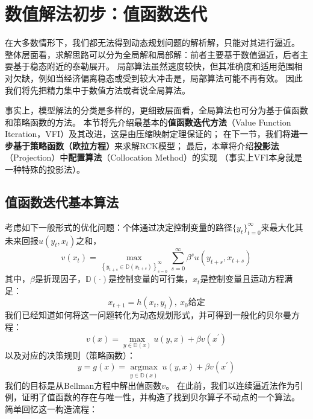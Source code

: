 
\section{数值解法初步：值函数迭代}  \label{sec-numerical-methods-pre}

在大多数情形下，我们都无法得到动态规划问题的解析解，只能对其进行逼近。
整体层面看，求解思路可以分为全局解和局部解：前者主要基于数值逼近，后者主要基于稳态附近的泰勒展开。
局部算法虽然速度较快，但其准确度和适用范围相对欠缺，例如当经济偏离稳态或受到较大冲击是，局部算法可能不再有效。
因此我们将先把精力集中于数值方法或者说全局算法。

事实上，模型解法的分类是多样的，更细致层面看，全局算法也可分为基于值函数和策略函数的方法。
本节将先介绍最基本的\textbf{值函数迭代方法}（Value Function Iteration，VFI）及其改进，这是由压缩映射定理保证的；
在下一节，我们将\textbf{进一步基于策略函数（欧拉方程）}来求解RCK模型；
最后，本章将介绍\textbf{投影法}（Projection）中\textbf{配置算法}（Collocation Method）的实现
（事实上VFI本身就是一种特殊的投影法）。


\subsection{值函数迭代基本算法}

考虑如下一般形式的优化问题：个体通过决定控制变量的路径$\{y_t\}_{t=0}^{\infty}$来最大化其未来回报$u(y_t,x_t)$之和，
\begin{equation*}
    v\left(x_t\right) = \max _{\left\{y_{t+s} \in \mathbb{D}\left(x_{t+s}\right)\right\}_{s=0}^{\infty}} 
        \sum_{s=0}^{\infty} \beta^s u\left(y_{t+s}, x_{t+s}\right)
\end{equation*}
其中，$\beta$是折现因子，$\mathbb{D}(\cdot)$是控制变量的可行集，$x_t$是控制变量且运动方程满足：
\begin{equation*}
    x_{t+1} = h(x_t,y_t), ~x_0\text{给定}
\end{equation*}
我们已经知道如何将这一问题转化为动态规划形式，并可得到一般化的贝尔曼方程：
\begin{equation}
    v(x) = \max_{y\in\mathbb{D}(x)} u(y,x) + \beta v(x^{\prime})
\end{equation}
以及对应的决策规则（策略函数）：
\begin{equation*}
    y = g(x) = \underset{y \in \mathbb{D}(x)}{\operatorname{argmax}}~u(y,x)+\beta v(x^{\prime})
\end{equation*}
我们的目标是从Bellman方程中解出值函数$v$。
在此前，我们以连续逼近法作为引例，证明了值函数的存在与唯一性，并构造了找到贝尔算子不动点的一个算法。
简单回忆这一构造流程：

